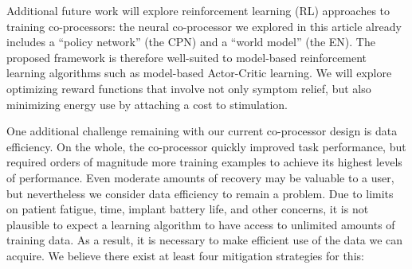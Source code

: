 \documentclass[12pt]{iopart}
\begin{document}
Additional future work will explore reinforcement learning (RL) approaches to training co-processors: the
neural co-processor we explored in this article already includes a ``policy network'' (the CPN) and a
``world model'' (the EN). The proposed framework is therefore well-suited to model-based reinforcement
learning algorithms such as model-based Actor-Critic learning. We will explore optimizing reward functions
that involve not only symptom relief, but also minimizing energy use by attaching a cost to stimulation.

One additional challenge remaining with our current co-processor design is data efficiency.
On the whole, the co-processor quickly improved task performance, but required orders of
magnitude more training examples to achieve its highest levels of performance. Even
moderate amounts of recovery may be valuable to a user, but nevertheless we consider
data efficiency to remain a problem. Due to limits on patient fatigue, time, implant
battery life, and other concerns, it is not plausible to expect a learning algorithm
to have access to unlimited amounts of training data. As a result, it is necessary to
make efficient use of the data we can acquire. We believe there exist at least four
mitigation strategies for this:
\end{document}
